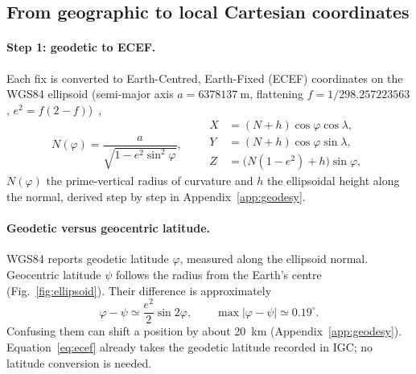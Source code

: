 \subsection{From geographic to local Cartesian coordinates}
\label{sec:enu}

\paragraph{Step 1: geodetic to ECEF.} Each fix is converted to Earth-Centred,
Earth-Fixed (ECEF) coordinates on the WGS84 ellipsoid (semi-major axis
$a=\SI{6378137}{\metre}$, flattening $f=1/298.257223563$, $e^2=f(2-f)$)~\cite{nga_wgs84,esa_navipedia_ellipsoidal_cartesian},
\begin{equation}
\label{eq:ecef}
N(\varphi)=\frac{a}{\sqrt{1-e^2\sin^2\varphi}},\qquad
\begin{aligned}
X &= (N+h)\cos\varphi\cos\lambda,\\
Y &= (N+h)\cos\varphi\sin\lambda,\\
Z &= \big(N(1-e^2)+h\big)\sin\varphi,
\end{aligned}
\end{equation}
$N(\varphi)$ the prime-vertical radius of curvature and $h$ the ellipsoidal height along
the normal, derived step by step in Appendix~\ref{app:geodesy}.

\paragraph{Geodetic versus geocentric latitude.}
WGS84 reports geodetic latitude $\varphi$, measured along the ellipsoid normal.
Geocentric latitude $\psi$ follows the radius from the Earth's centre
(Fig.~\ref{fig:ellipsoid}). Their difference is approximately
\[
 \varphi-\psi\simeq\frac{e^2}{2}\sin 2\varphi,
 \qquad \max|\varphi-\psi|\simeq0.19^\circ.
\]
Confusing them can shift a position by about \SI{20}{\kilo\metre}
(Appendix~\ref{app:geodesy}). Equation~\eqref{eq:ecef} already takes the
geodetic latitude recorded in IGC; no latitude conversion is needed.

